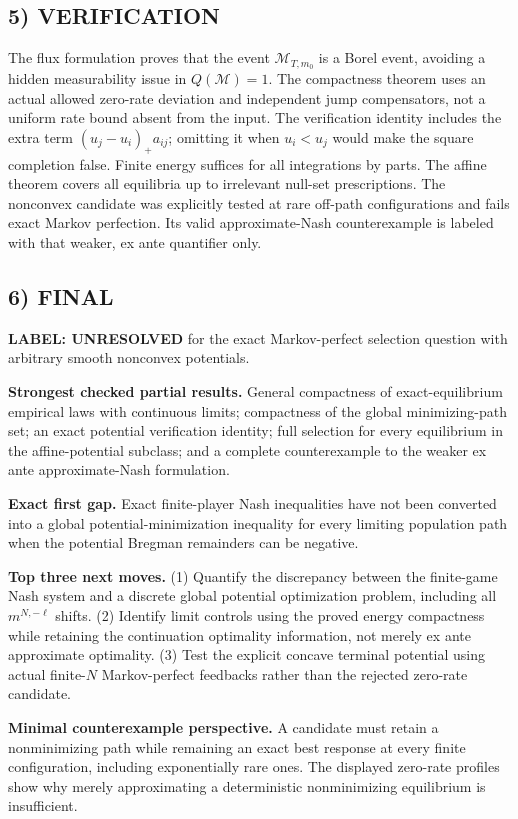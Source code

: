 \documentclass[11pt,a4paper]{article}
\theoremstyle{definition}
\theoremstyle{remark}
\begin{document}
\subsection*{5) VERIFICATION}
The flux formulation proves that the event $\mathcal M_{T,m_0}$ is a Borel event, avoiding a hidden measurability issue in $Q(\mathcal M)=1$. The compactness theorem uses an actual allowed zero-rate deviation and independent jump compensators, not a uniform rate bound absent from the input. The verification identity includes the extra term $(u_j-u_i)_+a_{ij}$; omitting it when $u_i<u_j$ would make the square completion false. Finite energy suffices for all integrations by parts. The affine theorem covers all equilibria up to irrelevant null-set prescriptions. The nonconvex candidate was explicitly tested at rare off-path configurations and fails exact Markov perfection. Its valid approximate-Nash counterexample is labeled with that weaker, ex ante quantifier only.

\subsection*{6) FINAL}
\textbf{LABEL: UNRESOLVED} for the exact Markov-perfect selection question with arbitrary smooth nonconvex potentials.

\textbf{Strongest checked partial results.} General compactness of exact-equilibrium empirical laws with continuous limits; compactness of the global minimizing-path set; an exact potential verification identity; full selection for every equilibrium in the affine-potential subclass; and a complete counterexample to the weaker ex ante approximate-Nash formulation.

\textbf{Exact first gap.} Exact finite-player Nash inequalities have not been converted into a global potential-minimization inequality for every limiting population path when the potential Bregman remainders can be negative.

\textbf{Top three next moves.} (1) Quantify the discrepancy between the finite-game Nash system and a discrete global potential optimization problem, including all $m^{N,-\ell}$ shifts. (2) Identify limit controls using the proved energy compactness while retaining the continuation optimality information, not merely ex ante approximate optimality. (3) Test the explicit concave terminal potential using actual finite-$N$ Markov-perfect feedbacks rather than the rejected zero-rate candidate.

\textbf{Minimal counterexample perspective.} A candidate must retain a nonminimizing path while remaining an exact best response at every finite configuration, including exponentially rare ones. The displayed zero-rate profiles show why merely approximating a deterministic nonminimizing equilibrium is insufficient.
\end{document}
